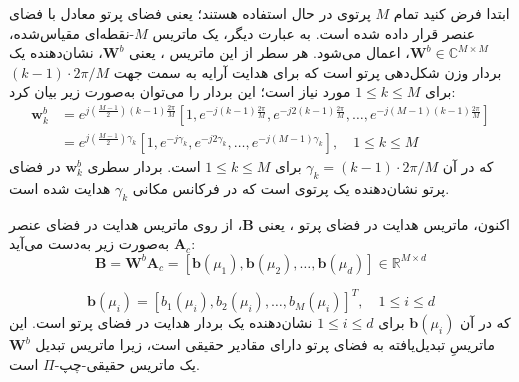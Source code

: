 ابتدا فرض کنید تمام $M$ پرتوی  در حال استفاده هستند؛ یعنی فضای پرتو معادل با فضای عنصر قرار داده شده است. به عبارت دیگر، یک ماتریس  $M$-نقطه‌ای مقیاس‌شده، $\bm{W}^b \in \mathbb{C}^{M \times M}$، اعمال می‌شود. هر سطر از این ماتریس ، یعنی $\bm{W}^b$، نشان‌دهنده یک بردار وزن شکل‌دهی پرتو است که برای هدایت آرایه به سمت جهت $(k-1) \cdot 2\pi/M$ برای $1 \leq k \leq M$ مورد نیاز است؛ این بردار را می‌توان به‌صورت زیر بیان کرد:
\begin{align}
	\bm{w}_k^b &= e^{j\left(\frac{M-1}{2}\right)(k-1)\frac{2\pi}{M}} [1, e^{-j(k-1)\frac{2\pi}{M}}, e^{-j2(k-1)\frac{2\pi}{M}}, \dots, e^{-j(M-1)(k-1)\frac{2\pi}{M}}] \nonumber \\
	&= e^{j\left(\frac{M-1}{2}\right)\gamma_k} [1, e^{-j\gamma_k}, e^{-j2\gamma_k}, \dots, e^{-j(M-1)\gamma_k}], \quad 1 \leq k \leq M
	\label{eq:5-70}
\end{align}
که در آن $\gamma_k = (k-1) \cdot 2\pi/M$ برای $1 \leq k \leq M$ است. بردار سطری $\bm{w}_k^b$ در فضای پرتو نشان‌دهنده یک پرتوی  است که در فرکانس مکانی $\gamma_k$ هدایت شده است.

اکنون، ماتریس هدایت در فضای پرتو ، یعنی $\bm{B}$، از روی ماتریس هدایت در فضای عنصر $\bm{A}_c$ به‌صورت زیر به‌دست می‌آید:
\begin{equation}
	\bm{B} = \bm{W}^b \bm{A}_c = [\bm{b}(\mu_1), \bm{b}(\mu_2), \dots, \bm{b}(\mu_d)] \in \mathbb{R}^{M \times d}
	\label{eq:5-71}
\end{equation}



\begin{equation}
	\bm{b}(\mu_i) = [b_1(\mu_i), b_2(\mu_i), \dots, b_M(\mu_i)]^T, \quad 1 \le i \le d
	\label{eq:5-72}
\end{equation}
که در آن $\bm{b}(\mu_i)$ برای $1 \le i \le d$ نشان‌دهنده یک بردار هدایت در فضای پرتو  است. این ماتریسِ تبدیل‌یافته به فضای پرتو  دارای مقادیر حقیقی است، زیرا ماتریس تبدیل $\bm{W}^b$ یک ماتریس حقیقی-چپ-$\Pi$ است.

